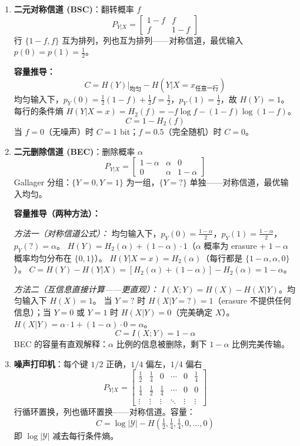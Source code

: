 \documentclass[12pt,a4paper]{ctexart}
\theoremstyle{definition}
\newcommand{\YY}{\mathcal{Y}}
\begin{document}
\begin{enumerate}[label=(\arabic*), leftmargin=*]
  \item \textbf{二元对称信道 (BSC)}：翻转概率 $f$
  \[
  P_{Y|X} = \begin{bmatrix} 1-f & f \\ f & 1-f \end{bmatrix}
  \]
  行 $\{1-f, f\}$ 互为排列，列也互为排列——对称信道，最优输入 $p(0)=p(1)=\frac12$。

  \textbf{容量推导：}
  \[
  C = H(Y)|_{\text{均匀}} - H(Y|X=x_{\text{任意一行}})
  \]
  均匀输入下，$p_Y(0) = \frac12(1-f) + \frac12 f = \frac12$，$p_Y(1) = \frac12$，故 $H(Y)=1$。
  每行的条件熵 $H(Y|X=x) = H_2(f) = -f\log f - (1-f)\log(1-f)$。
  \[
  \boxed{C = 1 - H_2(f)}
  \]
  当 $f=0$（无噪声）时 $C=1$ bit；$f=0.5$（完全随机）时 $C=0$。

  \item \textbf{二元删除信道 (BEC)}：删除概率 $\alpha$
  \[
  P_{Y|X} = \begin{bmatrix} 1-\alpha & \alpha & 0 \\ 0 & \alpha & 1-\alpha \end{bmatrix}
  \]
  Gallager 分组：$\{Y=0, Y=1\}$ 为一组，$\{Y=\text{?}\}$ 单独——对称信道，最优输入均匀。

  \textbf{容量推导（两种方法）：}

  \textit{方法一（对称信道公式）：}
  均匀输入下，$p_Y(0) = \frac{1-\alpha}{2}$，$p_Y(1) = \frac{1-\alpha}{2}$，$p_Y(\text{?}) = \alpha$。
  $H(Y) = H_2(\alpha) + (1-\alpha) \cdot 1$（$\alpha$ 概率为 erasure + $1-\alpha$ 概率均匀分布在 $\{0,1\}$）。
  $H(Y|X=x) = H_2(\alpha)$（每行都是 $\{1-\alpha, \alpha, 0\}$）。
  $C = H(Y) - H(Y|X) = [H_2(\alpha) + (1-\alpha)] - H_2(\alpha) = 1-\alpha$。

  \textit{方法二（互信息直接计算——更直观）：}
  $I(X;Y) = H(X) - H(X|Y)$。均匀输入下 $H(X)=1$。
  当 $Y=\text{?}$ 时 $H(X|Y=\text{?})=1$（erasure 不提供任何信息）；当 $Y=0$ 或 $Y=1$ 时 $H(X|Y)=0$（完美确定 $X$）。
  $H(X|Y) = \alpha \cdot 1 + (1-\alpha) \cdot 0 = \alpha$。
  \[
  \boxed{C = I(X;Y) = 1 - \alpha}
  \]
  BEC 的容量有直观解释：$\alpha$ 比例的信息被删除，剩下 $1-\alpha$ 比例完美传输。

  \item \textbf{噪声打印机}：每个键 $1/2$ 正确，$1/4$ 偏左，$1/4$ 偏右
  \[
  P_{Y|X} = \begin{bmatrix}
  \frac12 & \frac14 & 0 & \cdots & 0 & \frac14 \\
  \frac14 & \frac12 & \frac14 & \cdots & 0 & 0 \\
  \vdots & \vdots & \vdots & \ddots & \vdots & \vdots
  \end{bmatrix}
  \]
  行循环置换，列也循环置换——对称信道。容量：
  \[
  \boxed{C = \log|\YY| - H\!\left(\tfrac12,\tfrac14,\tfrac14,0,\ldots,0\right)}
  \]
  即 $\log|\YY|$ 减去每行条件熵。
\end{enumerate}
\end{document}
